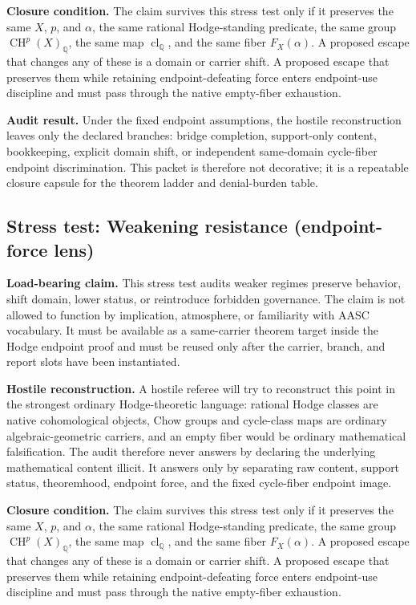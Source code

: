 \documentclass[11pt]{article}
\newcommand{\QQ}{\mathbb{Q}}
\newcommand{\CH}{\operatorname{CH}}
\newcommand{\clQ}{\operatorname{cl}_{\QQ}}
\begin{document}
\par\noindent\textbf{Closure condition.} The claim survives this stress test only if it preserves the same $X$, $p$, and $\alpha$, the same rational Hodge-standing predicate, the same group $\CH^p(X)_\QQ$, the same map $\clQ$, and the same fiber $F_X(\alpha)$. A proposed escape that changes any of these is a domain or carrier shift. A proposed escape that preserves them while retaining endpoint-defeating force enters endpoint-use discipline and must pass through the native empty-fiber exhaustion.

\par\noindent\textbf{Audit result.} Under the fixed endpoint assumptions, the hostile reconstruction leaves only the declared branches: bridge completion, support-only content, bookkeeping, explicit domain shift, or independent same-domain cycle-fiber endpoint discrimination. This packet is therefore not decorative; it is a repeatable closure capsule for the theorem ladder and denial-burden table.


\subsection{Stress test: Weakening resistance (endpoint-force lens)}

\par\noindent\textbf{Load-bearing claim.} This stress test audits weaker regimes preserve behavior, shift domain, lower status, or reintroduce forbidden governance. The claim is not allowed to function by implication, atmosphere, or familiarity with AASC vocabulary. It must be available as a same-carrier theorem target inside the Hodge endpoint proof and must be reused only after the carrier, branch, and report slots have been instantiated.

\par\noindent\textbf{Hostile reconstruction.} A hostile referee will try to reconstruct this point in the strongest ordinary Hodge-theoretic language: rational Hodge classes are native cohomological objects, Chow groups and cycle-class maps are ordinary algebraic-geometric carriers, and an empty fiber would be ordinary mathematical falsification. The audit therefore never answers by declaring the underlying mathematical content illicit. It answers only by separating raw content, support status, theoremhood, endpoint force, and the fixed cycle-fiber endpoint image.

\par\noindent\textbf{Closure condition.} The claim survives this stress test only if it preserves the same $X$, $p$, and $\alpha$, the same rational Hodge-standing predicate, the same group $\CH^p(X)_\QQ$, the same map $\clQ$, and the same fiber $F_X(\alpha)$. A proposed escape that changes any of these is a domain or carrier shift. A proposed escape that preserves them while retaining endpoint-defeating force enters endpoint-use discipline and must pass through the native empty-fiber exhaustion.
\end{document}
